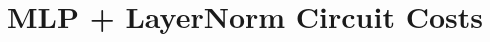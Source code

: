 \documentclass[sigconf,anonymous,review,balance=false]{acmart}
\begin{document}




\appendix









\section{MLP + LayerNorm Circuit Costs}
\label{appx:mlp-costs}
\end{document}
